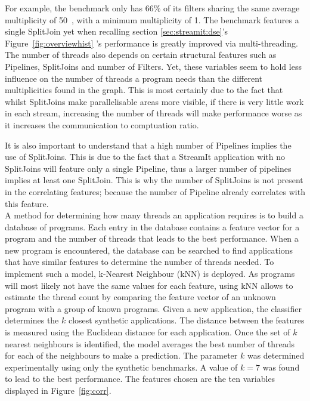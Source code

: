 For example, the benchmark  only has 66\% of its filters sharing the same average multiplicity of 50~\cite{thiesStreamit2010}, with a minimum multiplicity of 1. 
The benchmark features a single SplitJoin yet when recalling section \ref{sec:streamit:dse}'s Figure~\ref{fig:overviewhist} 's performance is greatly improved via multi-threading.
The number of threads also depends on certain structural features such as Pipelines, SplitJoins and number of Filters.
Yet, these variables seem to hold less influence on the number of threads a program needs than the different multiplicities found in the graph.
This is most certainly due to the fact that whilst SplitJoins make parallelisable areas more visible, if there is very little work in each stream, increasing the number of threads will make performance worse as it increases the communication to comptuation ratio.

It is also important to understand that a high number of Pipelines implies the use of SplitJoins.
This is due to the fact that a StreamIt application with no SplitJoins will feature only a single Pipeline, thus a larger number of pipelines implies at least one SplitJoin.
This is why the number of SplitJoins is not present in the correlating features; because the number of Pipeline already correlates with this feature.\\

A method for determining how many threads an application requires is to build a database of programs.
Each entry in the database contains a feature vector for a program and the number of threads that leads to the best performance.
When a new program is encountered, the database can be searched to find applications that have similar features to determine the number of threads needed.
To implement such a model, k-Nearest Neighbour (kNN) is deployed.
As programs will most likely not have the same values for each feature, using kNN allows to estimate the thread count by comparing the feature vector of an unknown program with a group of known programs.
Given a new application, the classifier determines the $k$ closest synthetic applications.
The distance between the features is measured using the Euclidean distance for each application.
Once the set of $k$ nearest neighbours is identified, the model averages the best number of threads for each of the neighbours to make a prediction. 
The parameter $k$ was determined experimentally using only the synthetic benchmarks.
A value of $k=7$ was found to lead to the best performance.
The features chosen are the ten variables displayed in Figure~\ref{fig:corr}.

